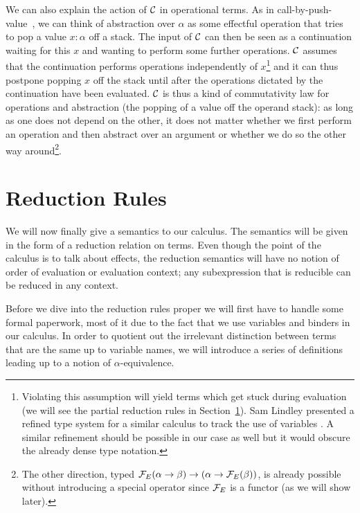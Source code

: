 We can also explain the action of $\mathcal{C}$ in operational terms. As in
call-by-push-value~\cite{levy1999call}, we can think of abstraction over
$\alpha$ as some effectful operation that tries to pop a value $x : \alpha$
off a stack. The input of $\mathcal{C}$ can then be seen as a continuation waiting
for this $x$ and wanting to perform some further operations. $\mathcal{C}$ assumes
that the continuation performs operations independently of
$x$\footnote{Violating this assumption will yield terms which get stuck
  during evaluation (we will see the partial reduction rules in
  Section~\ref{sec:reductions}). Sam Lindley presented a refined type
  system for a similar calculus to track the use of variables
  \cite{lindley2014algebraic}. A similar refinement should be possible in
  our case as well but it would obscure the already dense type notation.}
and it can thus postpone popping $x$ off the stack until after the
operations dictated by the continuation have been evaluated. $\mathcal{C}$ is thus
a kind of commutativity law for operations and abstraction (the popping of
a value off the operand stack): as long as one does not depend on the
other, it does not matter whether we first perform an operation and then
abstract over an argument or whether we do so the other way
around\footnote{The other direction, typed $\mathcal{F}_E(\alpha \to \beta) \to
  (\alpha \to \mathcal{F}_E(\beta))$, is already possible without introducing a
  special operator since $\mathcal{F}_E$ is a functor (as we will show later).}.


\section{Reduction Rules}
\label{sec:reductions}

We will now finally give a semantics to our calculus. The semantics will be
given in the form of a reduction relation on terms. Even though the point
of the calculus is to talk about effects, the reduction semantics will have
no notion of order of evaluation or evaluation context; any subexpression
that is reducible can be reduced in any context.

Before we dive into the reduction rules proper we will first have to handle
some formal paperwork, most of it due to the fact that we use variables and
binders in our calculus. In order to quotient out the irrelevant
distinction between terms that are the same up to variable names, we will
introduce a series of definitions leading up to a notion of
$\alpha$-equivalence.

